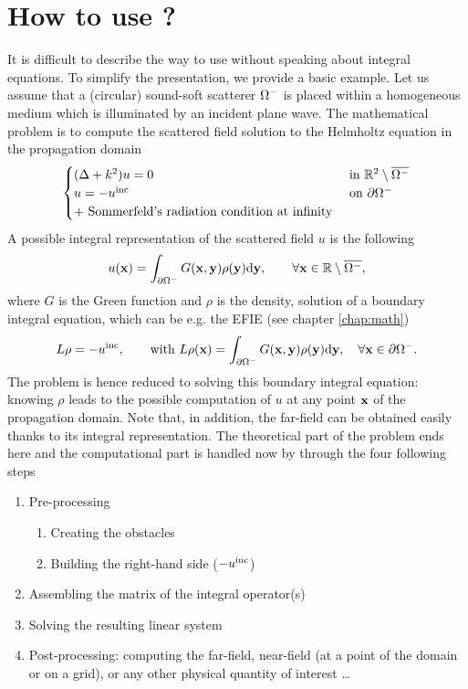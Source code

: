 \section*{How to use \mudiff?}

It is difficult to  describe the way to  use \mudiff without speaking about integral equations. To simplify the presentation, we provide a basic example.
Let us assume that  a (circular) sound-soft scatterer $\Omega^-$ is placed within a homogeneous medium which is  illuminated by an incident plane wave.
 The mathematical problem is to compute the scattered field  solution to the Helmholtz equation in the propagation domain
$$
\begin{cases}
(\Delta+k^2)u = 0 & \text{ in }{\mathbb{R}}^2\setminus\overline{\Omega^-}\\
u = -u^{\textrm{inc}}&\text{ on }\partial\Omega^-\\
\text{+ Sommerfeld's radiation condition at infinity}
\end{cases}
$$
A possible integral representation of the scattered field $u$ is the following
$$
u({\mathbf{x}}) = \int_{\partial\Omega^-} G({\mathbf{x}},{\mathbf{y}})\rho({\mathbf{y}}){\rm d}{\mathbf{y}}, \qquad \forall {\mathbf{x}}\in{\mathbb{R}}\setminus\overline{\Omega^-},
$$
where $G$ is the Green function and $\rho$ is the density, solution of a boundary integral equation, which can be e.g. the EFIE (see chapter \ref{chap:math})
$$
L\rho = -u^{\textrm{inc}}, \qquad \text{with } L\rho({\mathbf{x}}) = \int_{\partial\Omega^-} G({\mathbf{x}},{\mathbf{y}})\rho({\mathbf{y}}){\rm d}{\mathbf{y}}, \quad \forall {\mathbf{x}}\in\partial\Omega^-.
$$
The problem is hence reduced to solving this boundary integral equation: knowing $\rho$ leads to the possible computation of $u$ at any point ${\mathbf{x}}$ of the propagation domain. Note that, in addition, the far-field can be obtained easily thanks to its integral representation. The theoretical part of the problem ends here and the computational part is handled now by \mudiff through the four following steps
\begin{enumerate}
\item Pre-processing
\begin{enumerate}
\item Creating the obstacles
\item Building the right-hand side ($-u^{\textrm{inc}}$)
\end{enumerate}
\item Assembling the matrix of the integral operator(s)
\item Solving the resulting linear system
\item Post-processing: computing the far-field, near-field (at a point of the  domain or on a grid), or any other physical quantity of interest \ldots
\end{enumerate}

